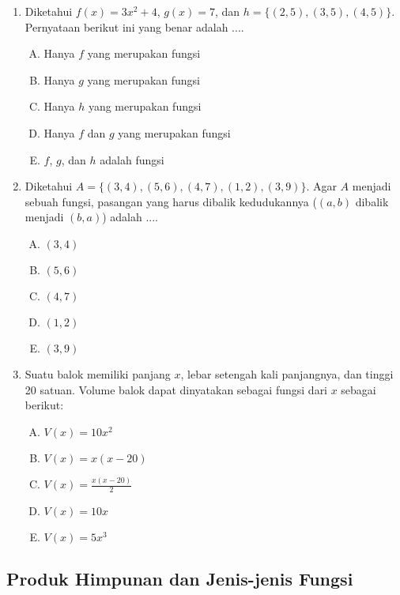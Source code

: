 \documentclass[fleqn, a4paper, 12pt]{article} %
\begin{document}
\begin{enumerate}
		\item Diketahui $f(x) = 3x^2 + 4$, $g(x) = 7$, dan $h = \{(2, 5), (3, 5), (4, 5)\}$. Pernyataan berikut ini yang benar adalah ....
		\begin{enumerate}[(A)]
			\item Hanya $f$ yang merupakan fungsi
			\item Hanya $g$ yang merupakan fungsi
			\item Hanya $h$ yang merupakan fungsi
			\item Hanya $f$ dan $g$ yang merupakan fungsi
			\item $f$, $g$, dan $h$ adalah fungsi
		\end{enumerate}
		\item Diketahui $A = \{(3, 4), (5, 6), (4, 7), (1, 2), (3, 9)\}$. Agar $A$ menjadi sebuah fungsi, pasangan yang harus dibalik kedudukannya ($(a, b)$ dibalik menjadi $(b, a)$) adalah ....
		\begin{enumerate}[(A)]
			\item $(3, 4)$
			\item $(5, 6)$
			\item $(4, 7)$
			\item $(1, 2)$
			\item $(3, 9)$
		\end{enumerate}
		\item Suatu balok memiliki panjang $x$, lebar setengah kali panjangnya, dan tinggi 20 satuan. Volume balok dapat dinyatakan sebagai fungsi dari $x$ sebagai berikut:
			\begin{enumerate}[(A)]
				\item $V(x) = 10x^2$
				\item $V(x) = x (x - 20)$
				\item $V(x) = \frac{x (x - 20)}{2}$
				\item $V(x) = 10x$
				\item $V(x) = 5x^3$
			\end{enumerate}
	\end{enumerate}
	
	\subsection{Produk Himpunan dan Jenis-jenis Fungsi}
	
\end{document}
